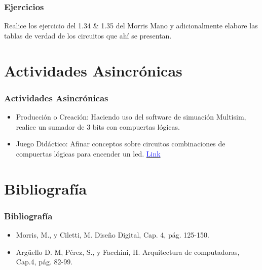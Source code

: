 \documentclass[11pt]{beamer}
\begin{document}
\begin{frame}
\frametitle{Ejercicios}
Realice los ejercicio del 1.34 \& 1.35 del Morris Mano y adicionalmente elabore las tablas de verdad de los circuitos que ah\'i se presentan.
\end{frame}

\section{Actividades Asincr\'onicas}
\begin{frame}
\frametitle{Actividades Asincr\'onicas}
	\begin{itemize}
		\item Producci\'on o Creaci\'on: Haciendo uso del software de simuaci\'on Multisim, realice un sumador de 3 bits con compuertas l\'ogicas.
		\item Juego Did\'actico: Afinar conceptos sobre circuitos combinaciones de compuertas lógicas para encender un led.
\href{https://www.cerebriti.com/juegos-de-matematicas/compuertas-logicas}{\textcolor{blue}{Link}}
	\end{itemize}
\end{frame}

\section{Bibliograf\'ia}
\begin{frame}
	\frametitle{Bibliograf\'ia}
	\begin{itemize}
		\item Morris, M., y Ciletti, M. Diseño Digital, Cap. 4, pág. 125-150.
		\item Argüello D. M, Pérez, S., y Facchini, H. Arquitectura de computadoras, Cap.4, pág. 82-99.
		\end{itemize}
\end{frame}
\end{document}
